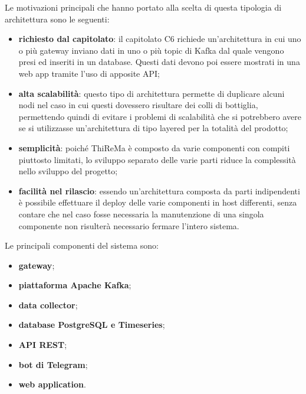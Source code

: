 		Le motivazioni principali che hanno portato alla scelta di questa tipologia di architettura sono le seguenti:
		\begin{itemize}
		 	\item \textbf{richiesto dal capitolato}: il capitolato C6 richiede un'architettura in cui uno o più gateway inviano dati in uno o più topic di Kafka dal quale vengono presi ed inseriti in un database. Questi dati devono poi essere mostrati in una web app tramite l'uso di apposite API;
		 	\item \textbf{alta scalabilità}: questo tipo di architettura permette di duplicare alcuni nodi nel caso in cui questi dovessero risultare dei colli di bottiglia, permettendo quindi di evitare i problemi di scalabilità che si potrebbero avere se si utilizzasse un'architettura di tipo layered per la totalità del prodotto;
		 	\item \textbf{semplicità}: poiché ThiReMa è composto da varie componenti con compiti piuttosto limitati, lo sviluppo separato delle varie parti riduce la complessità nello sviluppo del progetto;
		 	\item \textbf{facilità nel rilascio}: essendo un'architettura composta da parti indipendenti è possibile effettuare il deploy delle varie componenti in host differenti, senza contare che nel caso fosse necessaria la manutenzione di una singola componente non risulterà necessario fermare l'intero sistema.
		\end{itemize}

		Le principali componenti del sistema sono:
		\begin{itemize}
		  	\item \textbf{gateway};
		  	\item \textbf{piattaforma Apache Kafka};
		  	\item \textbf{data collector};
		  	\item \textbf{database PostgreSQL e Timeseries};
		  	\item \textbf{API REST};
		  	\item \textbf{bot di Telegram};
		  	\item \textbf{web application}.    
		\end{itemize} 



			









